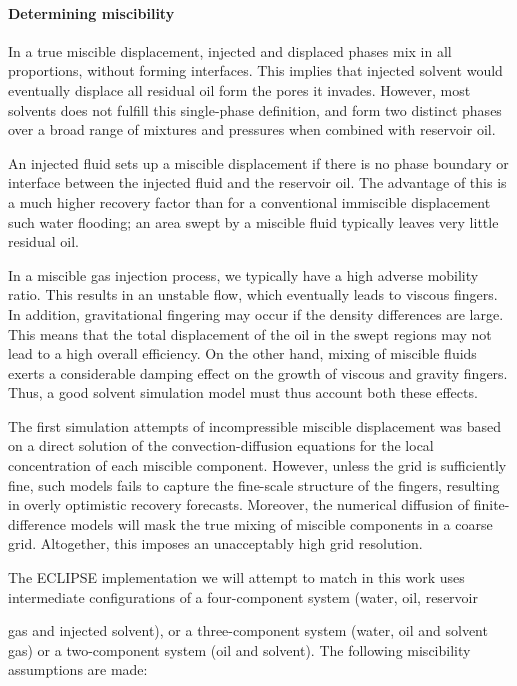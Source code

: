 \documentclass[11pt, a4paper]{article}
\begin{document}
\paragraph{Determining miscibility}

In a true miscible displacement, injected and displaced phases mix in all
proportions, without forming interfaces. This implies that injected solvent
would eventually displace all residual oil form the pores it invades. However,
most solvents does not fulfill this single-phase definition, and form two
distinct phases over a broad range of mixtures and pressures when combined with
reservoir oil. 



An injected fluid sets up a miscible displacement if there is no phase boundary
or interface between the injected fluid and the reservoir oil. The advantage of
this is a much higher recovery factor than for a conventional immiscible
displacement such water flooding; an area swept by a miscible fluid typically
leaves very little residual oil.

In a miscible gas injection process, we typically have a high adverse mobility
ratio. This results in an unstable flow, which eventually leads to viscous
fingers. In addition, gravitational fingering may occur if the density
differences are large. This means that the total displacement of the oil in the
swept regions may not lead to a high overall efficiency. On the other hand,
mixing of miscible fluids exerts a considerable damping effect on the growth of
viscous and gravity fingers. Thus, a good solvent simulation model must thus
account both these effects.

The first simulation attempts of incompressible miscible displacement was based
on a direct solution of the convection-diffusion equations for the local
concentration of each miscible component. However, unless the grid is
sufficiently fine, such models fails to capture the fine-scale structure of the
fingers, resulting in overly optimistic recovery forecasts. Moreover, the
numerical diffusion of finite-difference models will mask the true mixing of
miscible components in a coarse grid. Altogether, this imposes an unacceptably
high grid resolution.

The ECLIPSE implementation we will attempt to match in this work uses
intermediate configurations of a four-component system (water, oil, reservoir

gas and injected solvent), or a three-component system (water, oil and solvent
gas) or a two-component system (oil and solvent). The following miscibility
assumptions are made:
\end{document}
